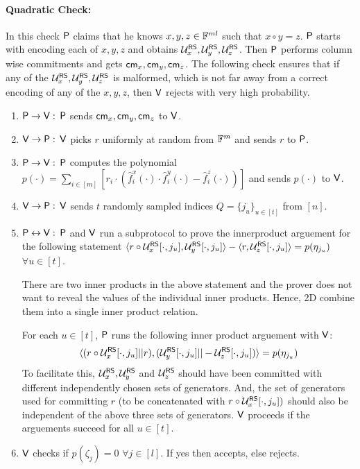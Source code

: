 \paragraph{\textbf{Quadratic Check:}}\label{sec: quadratic} In this check $\mathsf{P}$ claims that he knows $x,y,z\in\mathbb{F}^{ml}$ such that $x \circ y = z$. $\mathsf{P}$ starts with encoding each of $x, y, z$ and obtains $\mathcal{U}^{\mathsf{RS}}_x, \mathcal{U}^{\mathsf{RS}}_y, \mathcal{U}^{\mathsf{RS}}_z$. Then $\mathsf{P}$ performs column wise commitments and gets $\mathsf{cm}_x, \mathsf{cm}_y, \mathsf{cm}_z$. The following check ensures that if any of the $\mathcal{U}^{\mathsf{RS}}_x, \mathcal{U}^{\mathsf{RS}}_y, \mathcal{U}^{\mathsf{RS}}_z$ is malformed, which is not far away from a correct encoding of any of the $x, y, z$, then $\mathsf{V}$ rejects with very high probability.
\begin{enumerate}
	\item $\mathsf{P} \rightarrow \mathsf{V}: $ $\mathsf{P}$ sends $\mathsf{cm}_x, \mathsf{cm}_y, \mathsf{cm}_z$ to $\mathsf{V}$.
	
	\item $\mathsf{V} \rightarrow \mathsf{P}: $ $\mathsf{V}$ picks $r$ uniformly at random from $\mathbb{F}^{m}$ and sends $r$ to $\mathsf{P}$.
	
	\item $\mathsf{P} \rightarrow \mathsf{V}: $ $\mathsf{P}$ computes the polynomial $p(\cdot)= \sum_{i\in [m]} [r_i\cdot (\hat{f}^x_i(\cdot)\cdot \hat{f}^y_i(\cdot) - \hat{f}^z_i(\cdot))] $ and sends $p(\cdot)$ to $\mathsf{V}$. 
	
	\item $\mathsf{V} \rightarrow \mathsf{P}: $ $\mathsf{V}$ sends $t$ randomly sampled indices $Q=\{j_u\}_{u\in[t]}$ from $[n]$.
	
	\item $\mathsf{P} \leftrightarrow \mathsf{V}: $ $\mathsf{P}$ and $\mathsf{V}$ run a subprotocol to prove the innerproduct arguement for the following statement $\langle r\circ \mathcal{U}^{\mathsf{RS}}_x[\cdot,j_u],\mathcal{U}^{\mathsf{RS}}_y[\cdot,j_u]\rangle - \langle r,\mathcal{U}^{\mathsf{RS}}_z[\cdot,j_u]\rangle = p(\eta_{j_u})$ $\forall u\in[t]$. 
	
	There are two inner products in the above statement and the prover does not want to reveal the values of the individual inner products. Hence, \name2D combine them into a single inner product relation.
	
	For each $u\in[t]$, $\mathsf{P}$ runs the following inner product arguement with $\mathsf{V}$:
	$$\langle (r\circ \mathcal{U}^{\mathsf{RS}}_x[\cdot,j_u]||r),(\mathcal{U}^{\mathsf{RS}}_y[\cdot,j_u]||-\mathcal{U}^{\mathsf{RS}}_z[\cdot,j_u])\rangle = p(\eta_{j_u})$$
	To facilitate this, $\mathcal{U}^{\mathsf{RS}}_x, \mathcal{U}^{\mathsf{RS}}_y$ and $\mathcal{U}^{\mathsf{RS}}_z$ should have been committed with different independently chosen sets of generators. And, the set of generators used for committing $r$ (to be concatenated with $r \circ \mathcal{U}^{\mathsf{RS}}_x [\cdot, j_u])$ should also be independent of the above three sets of generators. $\mathsf{V}$ proceeds if the arguements succeed for all $u\in[t]$.
	\item $\mathsf{V}$ checks if $p(\zeta_j)=0$ $\forall j\in[l]$. If yes then accepts, else rejects.
\end{enumerate}

